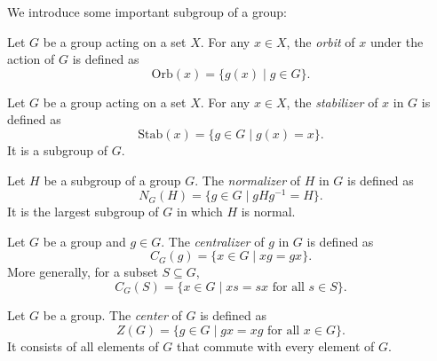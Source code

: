 \begin{definition*}
    We introduce some important subgroup of a group:
    \begin{definition}[Orbit]
    Let \( G \) be a group acting on a set \( X \).  
    For any \( x \in X \), the \emph{orbit} of \( x \) under the action of \( G \) is defined as
    \[
        \mathrm{Orb}(x) = \{ g(x) \mid g \in G \}.
    \]
\end{definition}

\begin{definition}[Stabilizer]
    Let \( G \) be a group acting on a set \( X \).  
    For any \( x \in X \), the \emph{stabilizer} of \( x \) in \( G \) is defined as
    \[
        \mathrm{Stab}(x) = \{ g \in G \mid g(x) = x \}.
    \]
    It is a subgroup of \( G \).
\end{definition}

\begin{definition}[Normalizer]
    Let \( H \) be a subgroup of a group \( G \).  
    The \emph{normalizer} of \( H \) in \( G \) is defined as
    \[
        N_G(H) = \{ g \in G \mid gHg^{-1} = H \}.
    \]
    It is the largest subgroup of \( G \) in which \( H \) is normal.
\end{definition}

\begin{definition}[Centralizer]
    Let \( G \) be a group and \( g \in G \).  
    The \emph{centralizer} of \( g \) in \( G \) is defined as
    \[
        C_G(g) = \{ x \in G \mid xg = gx \}.
    \]
    More generally, for a subset \( S \subseteq G \),
    \[
        C_G(S) = \{ x \in G \mid xs = sx \text{ for all } s \in S \}.
    \]
\end{definition}

\begin{definition}[Center]
    Let \( G \) be a group.  
    The \emph{center} of \( G \) is defined as
    \[
        Z(G) = \{ g \in G \mid gx = xg \text{ for all } x \in G \}.
    \]
    It consists of all elements of \( G \) that commute with every element of \( G \).
\end{definition}
\end{definition*}

